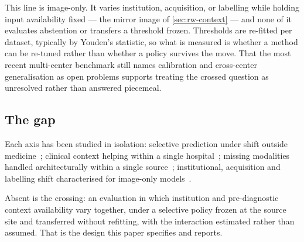 This line is image-only. It varies institution, acquisition, or labelling while
holding input availability fixed --- the mirror image of
\cref{sec:rw-context} --- and none of it evaluates abstention or transfers a
threshold frozen. Thresholds are re-fitted per dataset, typically by Youden's
statistic, so what is measured is whether a method can be re-tuned rather than
whether a policy survives the move. That the most recent multi-center benchmark
still names calibration and cross-center generalisation as open problems
supports treating the crossed question as unresolved rather than answered
piecemeal.

\subsection{The gap}

Each axis has been studied in isolation: selective prediction under shift
outside medicine~\cite{selective_shift_2025}; clinical context helping within a
single hospital~\cite{yang2025mcxnet,sloan2025clinically}; missing modalities
handled architecturally within a single
source~\cite{wang2025missing,wang2025moehealth}; institutional, acquisition and
labelling shift characterised for image-only
models~\cite{cohen2020limits,cxrlt2026,farquhar2026acquisition}.

Absent is the crossing: an evaluation in which institution and pre-diagnostic
context availability vary together, under a selective policy frozen at the
source site and transferred without refitting, with the interaction estimated
rather than assumed. That is the design this paper specifies and reports.
